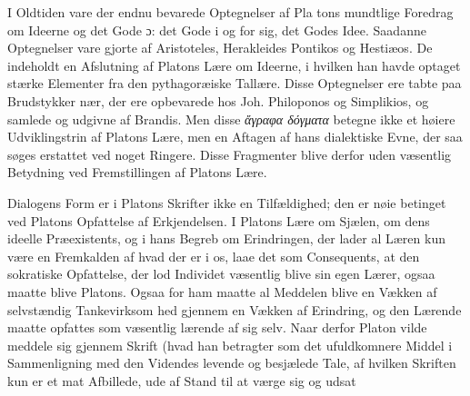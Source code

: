 \documentclass[12pt,a4paper]{book}
\newcommand{\gk}[1]{\textit{#1}}
\begin{document}
I Oldtiden vare der endnu bevarede Optegnelser af Pla\-%
tons mundtlige Foredrag om Ideerne og det Gode ɔ: det Gode
i og for sig, det Godes Idee. Saadanne Optegnelser vare
gjorte af Aristoteles, Herakleides Pontikos og Hestiæos. De
indeholdt en Afslutning af Platons Lære om Ideerne, i hvilken
han havde optaget stærke Elementer fra den pythagoræiske
Tallære. Disse Optegnelser ere tabte paa Brudstykker nær,
der ere opbevarede hos Joh. Philoponos og Simplikios, og
samlede og udgivne af Brandis. Men disse \gk{ἄγραφα δόγματα}
betegne ikke et høiere Udviklingstrin af Platons Lære, men en
Aftagen af hans dialektiske Evne, der saa søges erstattet ved
noget Ringere. Disse Fragmenter blive derfor uden væsentlig
Betydning ved Fremstillingen af Platons Lære.

Dialogens Form er i Platons Skrifter ikke en Tilfældighed;
den er nøie betinget ved Platons Opfattelse af Erkjendelsen.
I Platons Lære om Sjælen, om dens ideelle Præexistents, og i
hans Begreb om Erindringen, der lader al Læren kun være en
Fremkalden af hvad der er i os, laae det som Consequents,
at den sokratiske Opfattelse, der lod Individet væsentlig blive
sin egen Lærer, ogsaa maatte blive Platons. Ogsaa for ham
maatte al Meddelen blive en Vækken af selvstændig Tankevirksom\-%
hed gjennem en Vækken af Erindring, og den Lærende maatte
opfattes som væsentlig lærende af sig selv. Naar derfor
Platon vilde meddele sig gjennem Skrift (hvad han betragter
som det ufuldkomnere Middel i Sammenligning med den
Videndes levende og besjælede Tale, af hvilken Skriften kun
er et mat Afbillede, ude af Stand til at værge sig og udsat
%
\end{document}
